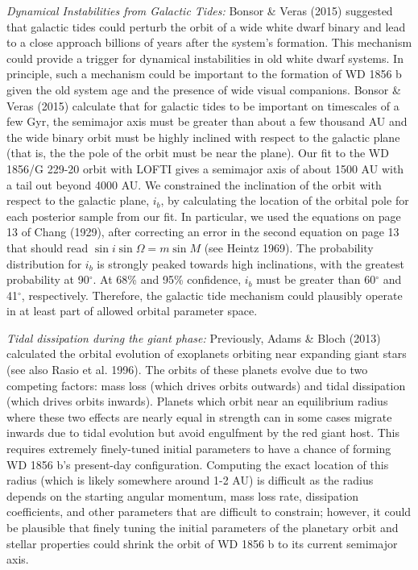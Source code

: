 \documentclass{nature3}
\newcommand*{\bedit}{\textcolor{new_black}}
\begin{document}
\begin{methods}
\textit{Dynamical Instabilities from Galactic Tides:} \bedit{Bonsor \& Veras (2015\cite{bonsorveras}) suggested that galactic tides could perturb the orbit of a wide white dwarf binary and lead to a close approach billions of years after the system's formation. This mechanism could provide a trigger for dynamical instabilities in old white dwarf systems. In principle, such a mechanism could be important to the formation of WD 1856 b given the old system age and the presence of wide visual companions. Bonsor \& Veras (2015\cite{bonsorveras}) calculate that for galactic tides to be important on timescales of a few Gyr, the semimajor axis must be greater than about a few thousand AU and the wide binary orbit must be highly inclined with respect to the galactic plane (that is, the the pole of the orbit must be near the plane). Our fit to the WD 1856/G 229-20  orbit with LOFTI gives a semimajor axis of about 1500 AU with a tail out beyond 4000 AU. We constrained the inclination of the orbit with respect to the galactic plane, $i_b$, by calculating the location of the orbital pole\cite{chang29, heintz69, agati15} for each posterior sample from our fit. In particular, we used the equations on page 13 of Chang (1929\cite{chang29}), after correcting an error in the second equation on page 13 that should read $\sin{i}\sin{\Omega} = m\sin{M}$ (see Heintz 1969\cite{heintz69}). The probability distribution for $i_b$ is strongly peaked towards high inclinations, with the greatest probability at 90$^\circ$. At 68\% and 95\% confidence, $i_b$ must be greater than 60$^\circ$ and 41$^\circ$, respectively. Therefore, the galactic tide mechanism could plausibly operate in at least part of allowed orbital parameter space. }

\textit{Tidal dissipation during the giant phase:} Previously, Adams \& Bloch (2013\cite{Adams2013}) calculated the orbital evolution of exoplanets orbiting near expanding giant stars (see also Rasio et al. 1996\cite{rasiotout}). The orbits of these planets evolve due to two competing factors: mass loss (which drives orbits outwards) and tidal dissipation (which drives orbits inwards). Planets which orbit near an equilibrium radius where these two effects are nearly equal in strength can in some cases migrate inwards due to tidal evolution but avoid engulfment by the red giant host. This requires extremely finely-tuned initial parameters to have a chance of forming WD 1856 b's present-day configuration. Computing the exact location of this radius (which is likely somewhere around 1-2 AU) is difficult as the radius depends on the starting angular momentum, mass loss rate, dissipation coefficients, and other parameters that are difficult to constrain; however, it could be plausible that finely tuning the initial parameters of the planetary orbit and stellar properties could shrink the orbit of WD 1856 b to its current semimajor axis. 


\end{methods}
\end{document}
